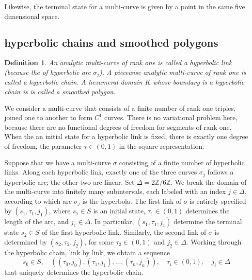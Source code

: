 \documentclass[11pt]{amsart}
\newtheorem{definition}{Definition}
\newcommand{\ring}[1]{\mathbb{#1}}
\def\ta{{\tau}}
\begin{document}
Likewise, the terminal state for a multi-curve is given by a point
in the same five dimensional space. 





\subsection{hyperbolic chains and smoothed polygons}

\begin{definition}
An analytic multi-curve of rank one is called a {\it hyperbolic link} (because the of hyperbolic arc $\sigma_j$).  A piecewise analytic
multi-curve of rank one is called a 
{\it hyperbolic chain}.
A hexameral domain $K$ whose boundary is a hyperbolic chain is
 is called a smoothed polygon.
\end{definition}

We consider a multi-curve that consists of a finite number of rank one triples, joined one to another to form $C^1$ curves.
There is no variational problem here, because there are no functional degrees of freedom for segments of rank one.  When the an initial state for a 
hyperbolic link is fixed, there is exactly one degree of freedom, 
the parameter $\ta\in(0,1)$
in the square representation.

 Suppose that we have a multi-curve $\sigma$
consisting of a finite number of hyperbolic links.    Along each hyperbolic link,
exactly one of the three curves $\sigma_j$ follows a hyperbolic arc;
the other two are linear.  Set $\Delta=2\ring{Z}/6\ring{Z}$.
We break the domain of the multi-curve
into finitely many subintervals, each labeled with an index
$j\in\Delta$, according to which arc $\sigma_j$ is the hyperbola.
The first link of $\sigma$
is entirely specified by $(s_1,\ta_1,j_1)$, where $s_1\in S$ is an initial state,
$\ta_1\in(0,1)$ determines the length of the arc, and $j_1\in\Delta$.  
In particular, $(s_1,\ta_1,j_1)$
determine the terminal state $s_2\in S$
of the first hyperbolic link.  Similarly, 
the second link of $\sigma$ is determined
by $(s_2,\ta_2,j_2)$, for some $\ta_2\in (0,1)$ and $j_2\in\Delta$.  Working through the hyperbolic
chain, link by link, we obtain a sequence
\begin{equation}\label{eqn:param}
  s_0\in S,\quad ((\ta_0,j_0),(\ta_1,j_1),\ldots,(\ta_n,j_n)),\quad \ta_i\in(0,1),\quad j_i\in\Delta
\end{equation}
that uniquely determines the hyperbolic chain.
\end{document}
